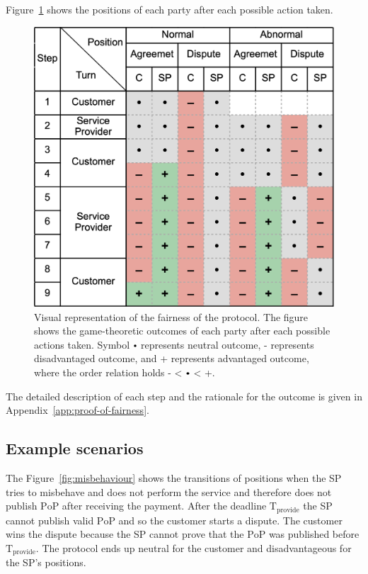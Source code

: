 \documentclass[pdftex,twocolumn,epjc3]{svjour3}
\newcommand{\plus}{+}
\newcommand{\minus}{-}
\newcommand\neutral[1][.75]{\mathbin{\ThisStyle{\vcenter{\hbox{%
  \scalebox{#1}{$\SavedStyle\bullet$}}}}}%
}
\begin{document}
{Figure~\ref{fig:positions} shows the positions of each party after each possible action taken.

\begin{figure}[h!]
\includegraphics[width=\linewidth]{model.png}
\centering
\caption{Visual representation of the fairness of the protocol. The figure shows the game-theoretic outcomes of each party after each possible actions taken. Symbol $\neutral${} represents neutral outcome, \minus{} represents disadvantaged outcome, and \plus{} represents advantaged outcome, where the order relation holds \minus{} < $\neutral${} < \plus{}.}
\label{fig:positions}
\end{figure}

The detailed description of each step and the rationale for the outcome is given in Appendix~\ref{app:proof-of-fairness}.

\subsection{Example scenarios}\label{example-scenarios}
The Figure~\ref{fig:misbehaviour} shows the transitions of positions when the SP tries to misbehave and does not perform the service and therefore does not publish $\mathrm{PoP}$ after receiving the payment. After the deadline $\mathrm{T}_\mathrm{provide}$ the SP cannot publish valid $\mathrm{PoP}$ and so the customer starts a dispute. The customer wins the dispute because the SP cannot prove that the $\mathrm{PoP}$ was published before $\mathrm{T}_\mathrm{provide}$. The protocol ends up neutral for the customer and disadvantageous for the SP's positions.

}
\end{document}
